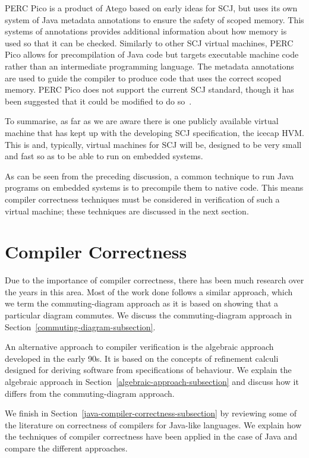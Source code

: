 PERC Pico is a product of Atego based on early ideas for SCJ, but uses
its own system of Java metadata annotations to ensure the safety of
scoped memory.
This systems of annotations provides additional information about how
memory is used so that it can be checked.
Similarly to other SCJ virtual machines, PERC Pico allows for
precompilation of Java code but targets executable machine code rather
than an intermediate programming language.
The metadata annotations are used to guide the compiler to produce
code that uses the correct scoped memory.
PERC Pico does not support the current SCJ standard, though it has
been suggested that it could be modified to do so~\cite{nilsen2011}.

To summarise, as far as we are aware there is one publicly available
virtual machine that has kept up with the developing SCJ
specification, the icecap HVM.
This is and, typically, virtual machines for SCJ will be, designed to
be very small and fast so as to be able to run on embedded systems.

As can be seen from the preceding discussion, a common technique to
run Java programs on embedded systems is to precompile them to native
code.
This means compiler correctness techniques must be considered in
verification of such a virtual machine; these techniques are discussed
in the next section.

\section{Compiler Correctness}
\label{compiler-correctness-section}

Due to the importance of compiler correctness, there has been much
research over the years in this area.
Most of the work done follows a similar approach, which we term
the commuting-diagram approach as it is based on showing that a
particular diagram commutes.
We discuss the commuting-diagram approach in
Section~\ref{commuting-diagram-subsection}.

An alternative approach to compiler verification is the algebraic
approach developed in the early 90s.
It is based on the concepts of refinement calculi designed for
deriving software from specifications of behaviour.
We explain the algebraic approach in
Section~\ref{algebraic-approach-subsection} and discuss how it differs
from the commuting-diagram approach.

We finish in Section~\ref{java-compiler-correctness-subsection} by
reviewing some of the literature on correctness of compilers for
Java-like languages.
We explain how the techniques of compiler correctness have been
applied in the case of Java and compare the different approaches.

